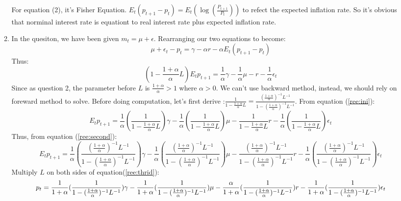 \documentclass[11pt]{article} %
\begin{document}
\begin{enumerate}
\begin{enumerate}
              For equation (2), it's Fisher Equation. $E_t(p_{t+1}-p_t)=E_t(\log(\frac{P_{t+1}}{P_t}))$ to refect the expected inflation rate. So it's obvious that norminal interest rate is equationt to real interest rate plus expected inflation rate.
        \item In the quesiton, we have been given $m_t=\mu+\epsilon$. Rearranging our two equations to become:
             \begin{equation}
                 \mu+\epsilon_t-p_t=\gamma-\alpha r-\alpha E_t(p_{t+1}-p_t)
             \end{equation}
             Thus:
             \begin{equation}\label{ree:ini}
                 (1-\frac{1+\alpha}{\alpha}L)E_tp_{t+1}=\frac{1}{\alpha}\gamma-\frac{1}{\alpha}\mu-r-\frac{1}{\alpha}\epsilon_t
             \end{equation}
             Since as question 2, the parameter before $L$ is $\frac{1+\alpha}{\alpha} >1$ where $\alpha >0$. We can't use backward method, instead, we should rely on foreward method to solve.
             Before doing computation, let's first derive :$\frac{1}{1-\frac{1+\alpha}{\alpha}L}=\frac{(\frac{1+\alpha}{\alpha})^{-1}L^{-1}}{1-(\frac{1+\alpha}{\alpha})^{-1}L^{-1}}$.
            From equation (\ref{ree:ini}):
            \begin{equation}\label{ree:second}
                E_tp_{t+1}=\frac{1}{\alpha}(\frac{1}{1-\frac{1+\alpha}{\alpha}L})\gamma-\frac{1}{\alpha}(\frac{1}{1-\frac{1+\alpha}{\alpha}L})\mu-\frac{1}{1-\frac{1+\alpha}{\alpha}L}r-\frac{1}{\alpha}(\frac{1}{1-\frac{1+\alpha}{\alpha}L})\epsilon_t
            \end{equation}
            Thus, from equation (\ref{ree:second}):
            \begin{equation}\label{ree:third}
                E_tp_{t+1}=\frac{1}{\alpha}(\frac{(\frac{1+\alpha}{\alpha})^{-1}L^{-1}}{1-(\frac{1+\alpha}{\alpha})^{-1}L^{-1}})\gamma-\frac{1}{\alpha}(\frac{(\frac{1+\alpha}{\alpha})^{-1}L^{-1}}{1-(\frac{1+\alpha}{\alpha})^{-1}L^{-1}})\mu-\frac{(\frac{1+\alpha}{\alpha})^{-1}L^{-1}}{1-(\frac{1+\alpha}{\alpha})^{-1}L^{-1}}r-\frac{1}{\alpha}(\frac{(\frac{1+\alpha}{\alpha})^{-1}L^{-1}}{1-(\frac{1+\alpha}{\alpha})^{-1}L^{-1}})\epsilon_t
            \end{equation}
            Multiply $L$ on both sides of equation(\ref{ree:thrid}):
                \begin{align}            
                p_t&=\frac{1}{1+\alpha}(\frac{1}{1-(\frac{1+\alpha}{\alpha})^{-1}L^{-1}})\gamma-\frac{1}{1+\alpha}(\frac{1}{1-(\frac{1+\alpha}{\alpha})^{-1}L^{-1}})\mu-\frac{\alpha}{1+\alpha}(\frac{1}{1-(\frac{1+\alpha}{\alpha})^{-1}L^{-1}})r-\frac{1}{1+\alpha}(\frac{1}{1-(\frac{1+\alpha}{\alpha})^{-1}L^{-1}})\epsilon_t \notag\\

\end{align}
\end{enumerate}
\end{enumerate}
\end{document}
